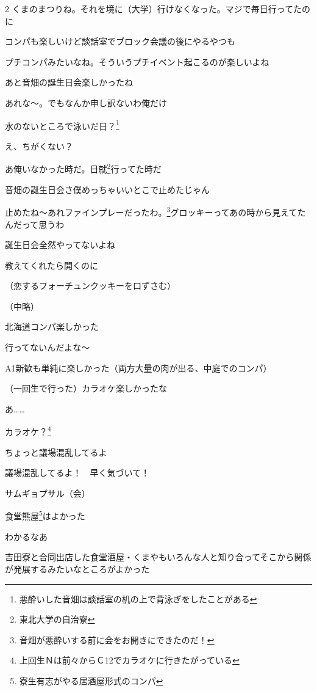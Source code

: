 \begin{multicols}{2}
 くまのまつりね。それを境に（大学）行けなくなった。マジで毎日行ってたのに

 コンパも楽しいけど談話室でブロック会議の後にやるやつも

 プチコンパみたいなね。そういうプチイベント起こるのが楽しいよね

 あと音畑の誕生日会楽しかったね

 あれな～。でもなんか申し訳ないわ俺だけ

 水のないところで泳いだ日？\footnote{悪酔いした音畑は談話室の机の上で背泳ぎをしたことがある}

 え、ちがくない？

 あ俺いなかった時だ。日就\footnote{東北大学の自治寮}行ってた時だ

 音畑の誕生日会さ僕めっちゃいいとこで止めたじゃん

 止めたね～あれファインプレーだったわ。\footnote{音畑が悪酔いする前に会をお開きにできたのだ！}グロッキーってあの時から見えてたんだって思うわ

 誕生日会全然やってないよね

 教えてくれたら開くのに

 （恋するフォーチュンクッキーを口ずさむ）

（中略）

 北海道コンパ楽しかった

 行ってないんだよな～

 A1新歓も単純に楽しかった（両方大量の肉が出る、中庭でのコンパ）

 （一回生で行った）カラオケ楽しかったな

 あ……

 カラオケ？\footnote{上回生Ｎは前々からＣ12でカラオケに行きたがっている}

 ちょっと議場混乱してるよ

 議場混乱してるよ！　早く気づいて！

 サムギョプサル（会）

 食堂熊屋\footnote{寮生有志がやる居酒屋形式のコンパ}はよかった

 わかるなあ

 吉田寮と合同出店した食堂酒屋・くまやもいろんな人と知り合ってそこから関係が発展するみたいなところがよかった


\end{multicols}
